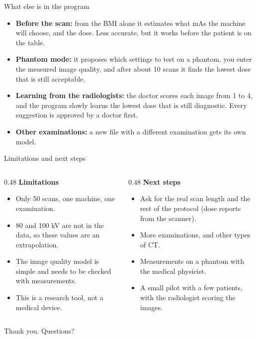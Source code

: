 \documentclass[aspectratio=169,11pt]{beamer}
\begin{document}
\begin{frame}{What else is in the program}
\begin{itemize}\itemsep8pt
  \item \textbf{Before the scan:} from the BMI alone it estimates what mAs the machine will choose, and the dose.
  Less accurate, but it works before the patient is on the table.
  \item \textbf{Phantom mode:} it proposes which settings to test on a phantom, you enter the measured image
  quality, and after about 10 scans it finds the lowest dose that is still acceptable.
  \item \textbf{Learning from the radiologists:} the doctor scores each image from 1 to 4, and the program slowly
  learns the lowest dose that is still diagnostic. Every suggestion is approved by a doctor first.
  \item \textbf{Other examinations:} a new file with a different examination gets its own model.
\end{itemize}
\end{frame}

\begin{frame}{Limitations and next steps}
\begin{columns}[T]
\begin{column}{0.48\textwidth}
\textbf{Limitations}
\begin{itemize}\itemsep4pt
  \item Only 50 scans, one machine, one examination.
  \item 80 and 100 kV are not in the data, so these values are an extrapolation.
  \item The image quality model is simple and needs to be checked with measurements.
  \item This is a research tool, not a medical device.
\end{itemize}
\end{column}
\begin{column}{0.48\textwidth}
\textbf{Next steps}
\begin{itemize}\itemsep4pt
  \item Ask for the real scan length and the rest of the protocol (dose reports from the scanner).
  \item More examinations, and other types of CT.
  \item Measurements on a phantom with the medical physicist.
  \item A small pilot with a few patients, with the radiologist scoring the images.
\end{itemize}
\end{column}
\end{columns}
\vspace{6mm}
\begin{center}\large Thank you. Questions?\end{center}
\end{frame}
\end{document}
